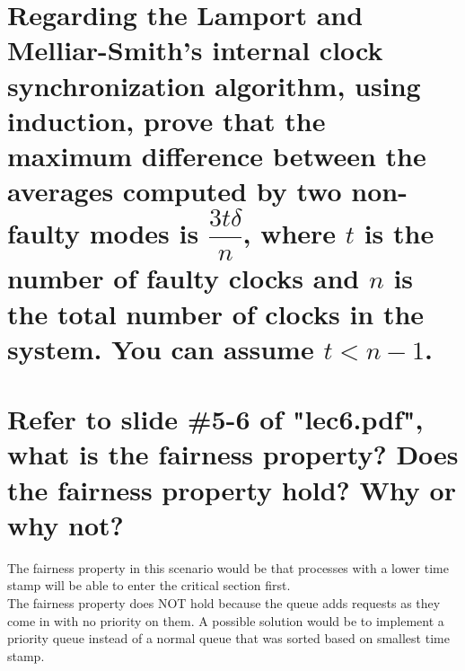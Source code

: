 \documentclass[times]{article}
\begin{document}
	

	\section{Regarding the Lamport and Melliar-Smith's internal clock synchronization algorithm, using induction, prove that the maximum difference between the averages computed by two non-faulty modes is $\dfrac{3t \delta}{n}$, where $t$ is the number of faulty clocks and $n$ is the total number of clocks in the system. You can assume $t < n-1$.}%



	\section{Refer to slide \#5-6 of "lec6.pdf", what is the fairness property? Does the fairness property hold? Why or why not?}%
	The fairness property in this scenario would be that processes with a lower time stamp will be able to enter the critical section first. \\
	The fairness property does NOT hold because the queue adds requests as they come in with no priority on them. A possible solution would be to implement a priority queue instead of a normal queue that was sorted based on smallest time stamp. \\
	

	
	
		
\end{document}
